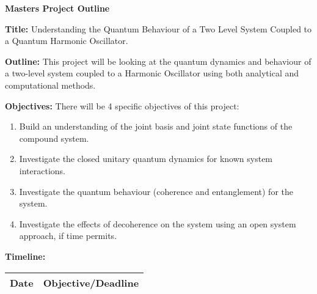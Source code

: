 \documentclass[a4, 12pt]{article}
\begin{document}
\begin{titlepage}


   
\thispagestyle{fancy}

\center

\textbf{{\Large Masters Project Outline}}

\vspace{0.3in}

\begin{flushleft}
    \textbf{Title:} Understanding the Quantum Behaviour of a Two Level System Coupled to a Quantum Harmonic Oscillator.
\end{flushleft}

\begin{flushleft}
    \textbf{Outline:} This project will be looking at the quantum dynamics and behaviour of a two-level system coupled to a Harmonic Oscillator using both analytical and computational methods. 
   
\end{flushleft}




\begin{flushleft}
    \textbf{Objectives:} There will be 4 specific objectives of this project:
    \begin{enumerate}
        \item Build an understanding of the joint basis and joint state functions of the compound system.
        \item Investigate the closed unitary quantum dynamics for known system interactions.
        \item Investigate the quantum behaviour (coherence and entanglement) for the system.
        \item Investigate the effects of decoherence on the system using an open system approach, if time permits.
    \end{enumerate}
    
\end{flushleft}


\vspace{0.1in}

\begin{flushleft}
    \textbf{Timeline:}

\begin{center}
\begin{tabular}{|c | c |}
\hline
 \textbf{Date} & \textbf{Objective/Deadline} \\ 
\hline


\end{tabular}
\end{center}
\end{flushleft}
\end{titlepage}
\end{document}
